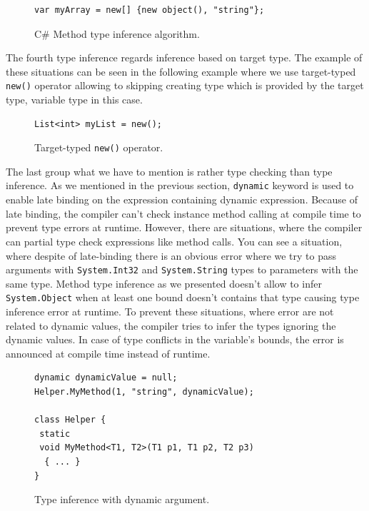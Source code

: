 \par
\begin{figure}
\begin{lstlisting}[style=csharp]
var myArray = new[] {new object(), "string"};
\end{lstlisting}
\caption{C\# Method type inference algorithm.}
\label{img08:arrayTypeInference}
\end{figure}
\par
{}
The fourth type inference regards inference based on target type.
The example of these situations can be seen in the following example where we use target-typed \texttt{new()} operator allowing to skipping creating type which is provided by the target type, variable type in this case.
\par
\begin{figure}
\begin{lstlisting}[style=csharp]
List<int> myList = new();
\end{lstlisting}
\caption{Target-typed \texttt{new()} operator.}
\label{img09:targetTypeInference}
\end{figure}
\par
{}
The last group what we have to mention is rather type checking than type inference.
As we mentioned in the previous section, \texttt{dynamic} keyword is used to enable late binding on the expression containing dynamic expression.
Because of late binding, the compiler can't check instance method calling at compile time to prevent type errors at runtime.
However, there are situations, where the compiler can partial type check expressions like method calls.
You can see a situation, where despite of late-binding there is an obvious error where we try to pass arguments with \texttt{System.Int32} and \texttt{System.String} types to parameters with the same type.
Method type inference as we presented doesn't allow to infer \texttt{System.Object} when at least one bound doesn't contains that type causing type inference error at runtime.
To prevent these situations, where error are not related to dynamic values, the compiler tries to infer the types ignoring the dynamic values.
In case of type conflicts in the variable's bounds, the error is announced at compile time instead of runtime.
\par
\begin{figure}
\begin{lstlisting}[style=csharp]
dynamic dynamicValue = null;
Helper.MyMethod(1, "string", dynamicValue);

class Helper {
 static
 void MyMethod<T1, T2>(T1 p1, T1 p2, T2 p3) 
  { ... }
}
\end{lstlisting}
\caption{Type inference with dynamic argument.}
\label{img010:dynamicChecking}
\end{figure}

